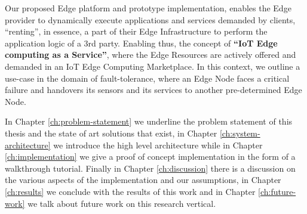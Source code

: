Our proposed  Edge platform and prototype implementation, enables the Edge provider to dynamically execute applications and services demanded by clients,  “renting”, in essence, a part of their Edge Infrastructure to perform the application logic of a 3rd party. Enabling thus, the concept of \textbf{“IoT Edge computing as a Service”}, where the Edge Resources are actively offered and demanded in an IoT Edge Computing Marketplace. In this context, we outline a use-case in the domain of \gls{fault-tolerance}, where an Edge Node faces a critical failure and handovers its sensors and its services to another pre-determined Edge Node.

In Chapter \ref{ch:problem-statement} we underline the problem statement of this thesis and the state of art solutions that exist, in Chapter \ref{ch:system-architecture} we introduce the high level architecture while in Chapter \ref{ch:implementation} we give a proof of concept implementation in the form of a walkthrough tutorial. Finally in Chapter \ref{ch:discussion} there is a discussion on the various aspects of the implementation and our assumptions, in Chapter \ref{ch:results} we conclude with the results of this work and in Chapter \ref{ch:future-work} we talk about future work on this research vertical.
